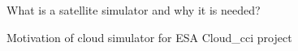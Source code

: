 
 
What is a satellite simulator and why it is needed?

Motivation of cloud simulator for ESA Cloud\_cci project

